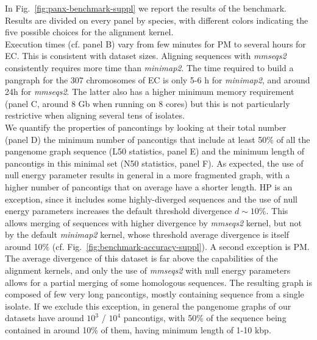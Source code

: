 \documentclass[aps,rmp,reprint,superscriptaddress,notitlepage,10pt,onecolumn]{revtex4-1}
\begin{document}
In Fig.~\ref{fig:panx-benchmark-suppl} we report the results of the benchmark. Results are divided on every panel by species, with different colors indicating the five possible choices for the alignment kernel.\\
Execution times (cf. panel B) vary from few minutes for PM to several hours for EC. This is consistent with dataset sizes. Aligning sequences with \textit{mmseqs2} consistently requires more time than \textit{minimap2}. The time required to build a pangraph for the 307 chromosomes of EC is only 5-6 h for \textit{minimap2}, and around 24h for \textit{mmseqs2}. The latter also has a higher minimum memory requirement (panel C, around 8 Gb when running on 8 cores) but this is not particularly restrictive when aligning several tens of isolates.\\
We quantify the properties of pancontings by looking at their total number (panel D) the minimum number of pancontigs that include at least 50\% of all the pangenome graph sequence (L50 statistics, panel E) and the minimum length of pancontigs in this minimal set (N50 statistics, panel F). As expected, the use of null energy parameter results in general in a more fragmented graph, with a higher number of pancontigs that on average have a shorter length. HP is an exception, since it includes some highly-diverged sequences and the use of null energy parameters increases the default threshold divergence $d \sim 10\%$. This allows merging of sequences with higher divergence by \textit{mmseqs2} kernel, but not by the default \textit{minimap2} kernel, whose threshold average divergence is itself around 10\% (cf. Fig.~\ref{fig:benchmark-accuracy-suppl}). A second exception is PM. The average divergence of this dataset is far above the capabilities of the alignment kernels, and only the use of \textit{mmseqs2} with null energy parameters allows for a partial merging of some homologous sequences. The resulting graph is composed of few very long pancontigs, mostly containing sequence from a single isolate. If we exclude this exception, in general the pangenome graphs of our datasets have around $10^3$ / $10^4$ pancontigs, with 50\% of the sequence being contained in around 10\% of them, having minimum length of 1-10 kbp.\\
\end{document}

